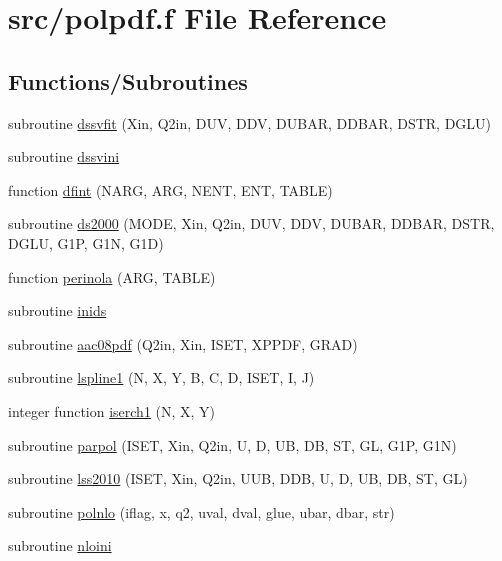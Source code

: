 \hypertarget{polpdf_8f}{}\section{src/polpdf.f File Reference}
\label{polpdf_8f}
\subsection*{Functions/\+Subroutines}
\begin{DoxyCompactItemize}
\item 
subroutine \hyperlink{polpdf_8f_afd1d368d6ebb9dd0fcff81eb028cc399}{dssvfit} (Xin, Q2in, D\+UV, D\+DV, D\+U\+B\+AR, D\+D\+B\+AR, D\+S\+TR, D\+G\+LU)
\item 
subroutine \hyperlink{polpdf_8f_a8e5f4c994c415921488124afc5dbf6d2}{dssvini}
\item 
function \hyperlink{polpdf_8f_ab97fb05f575804d70f2f4cc11b7a6396}{dfint} (N\+A\+RG, A\+RG, N\+E\+NT, E\+NT, T\+A\+B\+LE)
\item 
subroutine \hyperlink{polpdf_8f_ac537a7e2b44b985b2c5e2083c9fa7742}{ds2000} (M\+O\+DE, Xin, Q2in, D\+UV, D\+DV, D\+U\+B\+AR, D\+D\+B\+AR, D\+S\+TR, D\+G\+LU, G1P, G1N, G1D)
\item 
function \hyperlink{polpdf_8f_ac1559ba9c27197fb573cafd2d02ef288}{perinola} (A\+RG, T\+A\+B\+LE)
\item 
subroutine \hyperlink{polpdf_8f_a82b9b5d0217f872886739ce7c7755b92}{inids}
\item 
subroutine \hyperlink{polpdf_8f_abe9f73d8c98e5c5d6f644094fbc6625e}{aac08pdf} (Q2in, Xin, I\+S\+ET, X\+P\+P\+DF, G\+R\+AD)
\item 
subroutine \hyperlink{polpdf_8f_ac48cf37e34263c0e1d5ba2793fbccfc3}{lspline1} (N, X, Y, B, C, D, I\+S\+ET, I, J)
\item 
integer function \hyperlink{polpdf_8f_a5094e398279bf345f2c4628fcb666b9f}{iserch1} (N, X, Y)
\item 
subroutine \hyperlink{polpdf_8f_a8974471cdf7a32a43361f0ed8aada457}{parpol} (I\+S\+ET, Xin, Q2in, U, D, UB, DB, ST, GL, G1P, G1N)
\item 
subroutine \hyperlink{polpdf_8f_a931f3251bea4fe7a36354658de6802ef}{lss2010} (I\+S\+ET, Xin, Q2in, U\+UB, D\+DB, U, D, UB, DB, ST, GL)
\item 
subroutine \hyperlink{polpdf_8f_ae26fa03871621906a70975a835a4ee85}{polnlo} (iflag, x, q2, uval, dval, glue, ubar, dbar, str)
\item 
subroutine \hyperlink{polpdf_8f_a0cb6a9f9f33545f3057d9b115f5d055c}{nloini}

\end{DoxyCompactItemize}
